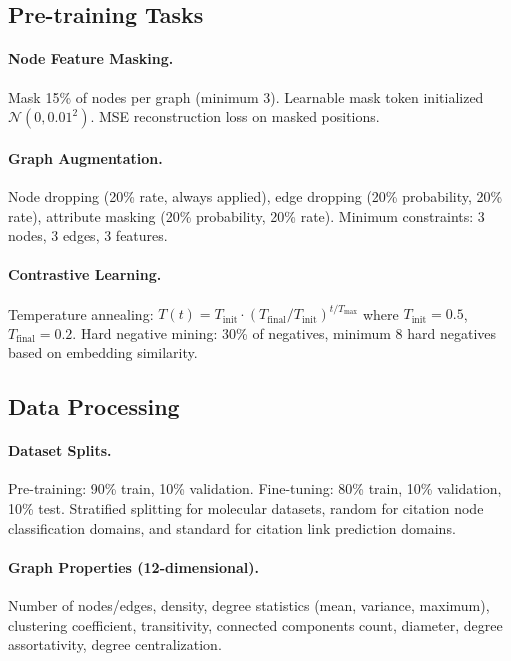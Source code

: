 \documentclass[11pt]{article}
\begin{document}
\subsection{Pre-training Tasks}

\paragraph{Node Feature Masking.} Mask 15\% of nodes per graph (minimum 3). Learnable mask token initialized $\mathcal{N}(0, 0.01^2)$. MSE reconstruction loss on masked positions.

\paragraph{Graph Augmentation.} Node dropping (20\% rate, always applied), edge dropping (20\% probability, 20\% rate), attribute masking (20\% probability, 20\% rate). Minimum constraints: 3 nodes, 3 edges, 3 features.

\paragraph{Contrastive Learning.} Temperature annealing: $T(t) = T_{\text{init}} \cdot (T_{\text{final}}/T_{\text{init}})^{t/T_{\text{max}}}$ where $T_{\text{init}} = 0.5$, $T_{\text{final}} = 0.2$. Hard negative mining: 30\% of negatives, minimum 8 hard negatives based on embedding similarity.

\subsection{Data Processing}

\paragraph{Dataset Splits.} Pre-training: 90\% train, 10\% validation. Fine-tuning: 80\% train, 10\% validation, 10\% test. Stratified splitting for molecular datasets, random for citation node classification domains, and standard for citation link prediction domains.

\paragraph{Graph Properties (12-dimensional).} Number of nodes/edges, density, degree statistics (mean, variance, maximum), clustering coefficient, transitivity, connected components count, diameter, degree assortativity, degree centralization.
\end{document}
